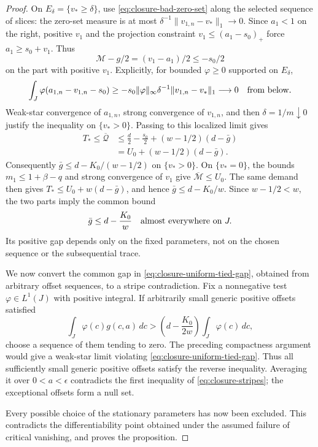 \begin{proof}
On \(E_\delta=\{v_*\ge\delta\}\), use
\eqref{eq:closure-bad-zero-set} along the selected sequence of slices:
the zero-set measure is at most
\(\delta^{-1}\|v_{1,n}-v_*\|_1\to0\).  Since \(a_1<1\) on the right, positive \(v_1\)
and the projection constraint \(v_1\le(a_1-s_0)_+\) force
\(a_1\ge s_0+v_1\).  Thus
\[
  \mathcal M-g/2=(v_1-a_1)/2\le-s_0/2
\]
on the part with positive \(v_1\).  Explicitly, for bounded
\(\varphi\ge0\) supported on \(E_\delta\),
\[
 \int_J\varphi(a_{1,n}-v_{1,n}-s_0)
  \ge-s_0\|\varphi\|_\infty\delta^{-1}\|v_{1,n}-v_*\|_1
  \longrightarrow0\quad\hbox{from below}.
\]
Weak-star convergence of \(a_{1,n}\), strong convergence of \(v_{1,n}\),
and then \(\delta=1/m\downarrow0\) justify the inequality on
\(\{v_*>0\}\).  Passing to this localized limit gives
\begin{align*}
  T_*\le\overline{\mathcal Q}
    &\le\frac d2-\frac{s_0}{2}
               +(w-1/2)(d-\bar g)\\
    &=U_0+(w-1/2)(d-\bar g).
\end{align*}
Consequently \(\bar g\le d-K_0/(w-1/2)\) on \(\{v_*>0\}\).
On \(\{v_*=0\}\), the bounds \(m_1\le1+\beta-q\) and strong
convergence of \(v_1\) give \(\overline{\mathcal M}\le U_0\).
The same demand then gives
\(T_*\le U_0+w(d-\bar g)\), and hence
\(\bar g\le d-K_0/w\).  Since \(w-1/2<w\), the two parts imply
the common bound
\begin{equation}
  \bar g\le d-\frac{K_0}{w}
  \quad\hbox{almost everywhere on }J.
  \label{eq:closure-uniform-tied-gap}
\end{equation}
Its positive gap depends only on the fixed parameters, not on the chosen
sequence or the subsequential trace.

We now convert the common gap in
\eqref{eq:closure-uniform-tied-gap}, obtained from arbitrary offset
sequences, to a stripe contradiction.
Fix a nonnegative test \(\varphi\in L^1(J)\) with positive integral.
If arbitrarily small generic positive offsets satisfied
\[
  \int_J\varphi(c)g(c,a)\,dc
    >\left(d-\frac{K_0}{2w}\right)\int_J\varphi(c)\,dc,
\]
choose a sequence of them tending to zero.  The preceding compactness
argument would give a weak-star limit violating
\eqref{eq:closure-uniform-tied-gap}.  Thus all sufficiently small generic
positive offsets satisfy the reverse inequality.  Averaging it over
\(0<a<\epsilon\) contradicts the first inequality of
\eqref{eq:closure-stripes}; the exceptional offsets form a null set.

Every possible choice of the stationary parameters has now been excluded.
This contradicts the differentiability point obtained under the assumed
failure of critical vanishing, and proves the proposition.
\end{proof}

